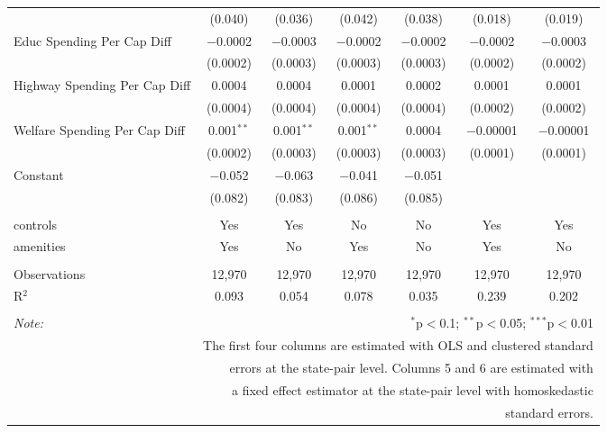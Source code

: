 \begin{table}[!htbp]
\begin{tabular}{@{\extracolsep{5pt}}lcccccc}
  & (0.040) & (0.036) & (0.042) & (0.038) & (0.018) & (0.019) \\ 
  Educ Spending Per Cap Diff & $-$0.0002 & $-$0.0003 & $-$0.0002 & $-$0.0002 & $-$0.0002 & $-$0.0003 \\ 
  & (0.0002) & (0.0003) & (0.0003) & (0.0003) & (0.0002) & (0.0002) \\ 
  Highway Spending Per Cap Diff & 0.0004 & 0.0004 & 0.0001 & 0.0002 & 0.0001 & 0.0001 \\ 
  & (0.0004) & (0.0004) & (0.0004) & (0.0004) & (0.0002) & (0.0002) \\ 
  Welfare Spending Per Cap Diff & 0.001$^{**}$ & 0.001$^{**}$ & 0.001$^{**}$ & 0.0004 & $-$0.00001 & $-$0.00001 \\ 
  & (0.0002) & (0.0003) & (0.0003) & (0.0003) & (0.0001) & (0.0001) \\ 
  Constant & $-$0.052 & $-$0.063 & $-$0.041 & $-$0.051 &  &  \\ 
  & (0.082) & (0.083) & (0.086) & (0.085) &  &  \\ 
 \hline \\[-1.8ex] 
controls & Yes & Yes & No & No & Yes & Yes \\ 
amenities & Yes & No & Yes & No & Yes & No \\ 
\hline \\[-1.8ex] 
Observations & 12,970 & 12,970 & 12,970 & 12,970 & 12,970 & 12,970 \\ 
R$^{2}$ & 0.093 & 0.054 & 0.078 & 0.035 & 0.239 & 0.202 \\ 
\hline 
\hline \\[-1.8ex] 
\textit{Note:}  & \multicolumn{6}{r}{$^{*}$p$<$0.1; $^{**}$p$<$0.05; $^{***}$p$<$0.01} \\ 
 & \multicolumn{6}{r}{The first four columns are estimated with OLS and clustered standard} \\ 
 & \multicolumn{6}{r}{ errors at the state-pair level. Columns 5 and 6 are estimated with} \\ 
 & \multicolumn{6}{r}{a fixed effect estimator at the state-pair level with homoskedastic} \\ 
 & \multicolumn{6}{r}{standard errors.} \\ 
\end{tabular} 
\end{table} 
